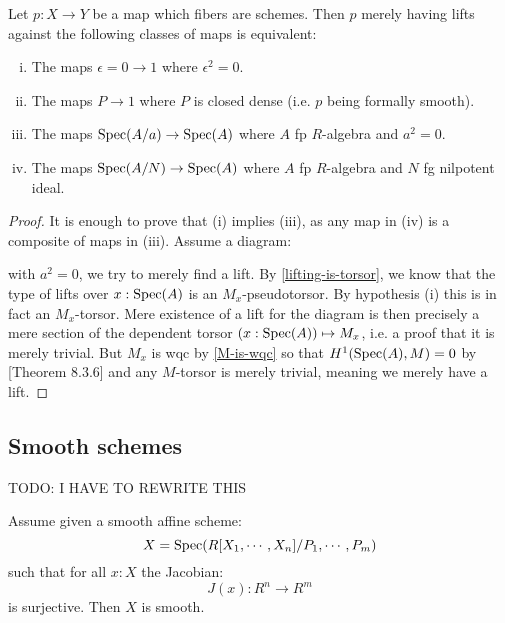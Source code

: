 \begin{proposition}
Let $p:X\to Y$ be a map which fibers are schemes. Then $p$ merely having lifts against the following classes of maps is equivalent:
\begin{enumerate}[(i)]
\item The maps $\epsilon=0\to 1$ where $\epsilon^2=0$.
\item The maps $P\to 1$ where $P$ is closed dense (i.e. $p$ being formally smooth).
\item The maps $\operatorname{Spec}(A/a)\to \operatorname{Spec}(A)$ where $A$ fp $R$-algebra and $a^2=0$.
\item The maps $\operatorname{Spec}(A/N)\to \operatorname{Spec}(A)$ where $A$ fp $R$-algebra and $N$ fg nilpotent ideal.
\end{enumerate}
\end{proposition}

\begin{proof}
It is enough to prove that (i) implies (iii), as any map in (iv) is a composite of maps in (iii). Assume a diagram:
 \begin{center}
    \end{center} 
    with $a^2=0$, we try to merely find a lift. By \cref{lifting-is-torsor}, we know that the type of lifts over $x:\operatorname{Spec}(A)$ is an $M_x$-pseudotorsor. By hypothesis (i) this is in fact an $M_x$-torsor. Mere existence of a lift for the diagram is then precisely a mere section of the dependent torsor $(x:\operatorname{Spec}(A))\mapsto M_x$, i.e. a proof that it is merely trivial. But $M_x$ is wqc by \cref{M-is-wqc} so that $H^1(\operatorname{Spec}(A),M)=0$ by \cite{draft}[Theorem 8.3.6] and any $M$-torsor is merely trivial, meaning we merely have a lift.
\end{proof}

\subsection{Smooth schemes}

TODO: I HAVE TO REWRITE THIS

\begin{lemma}
Assume given a smooth affine scheme:
\[X = \operatorname{Spec}(R[X_1,\cdots,X_n]/P_1,\cdots,P_m)\]
such that for all $x:X$ the Jacobian:
\[J(x) : R^n \to R^m\]
is surjective. Then $X$ is smooth.
\end{lemma}

